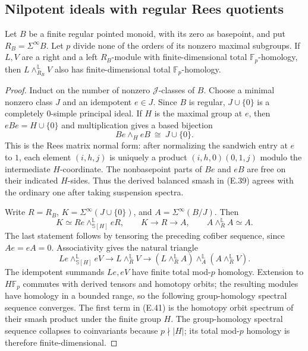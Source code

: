 \subsection{Nilpotent ideals with regular Rees quotients}

\begin{lemma}\label{E:regular-balanced-finiteness}
Let $B$ be a finite regular pointed monoid, with its zero as
basepoint, and put $R_B=\Sigma^\infty B$.  Let $p$ divide none of
the orders of its nonzero maximal subgroups.  If $L,V$ are a right
and a left $R_B$-module with finite-dimensional total
$\mathbb F_p$-homology, then
$L\wedge_{R_B}^{\mathbb L}V$ also has finite-dimensional total
$\mathbb F_p$-homology.
\end{lemma}

\begin{proof}
Induct on the number of nonzero $\mathcal J$-classes of $B$.
Choose a minimal nonzero class $J$ and an idempotent $e\in J$.
Since $B$ is regular, $J\cup\{0\}$ is a completely $0$-simple
principal ideal.  If $H$ is the maximal group at $e$, then
$eBe=H\cup\{0\}$ and multiplication gives a based bijection
\[
 Be\wedge_H eB\ \cong\ J\cup\{0\}.                 \tag{E.39}
\]
This is the Rees matrix normal form: after normalizing the sandwich
entry at $e$ to $1$, each element $(i,h,j)$ is uniquely a product
$(i,h,0)(0,1,j)$ modulo the intermediate $H$-coordinate.
The nonbasepoint parts of $Be$ and $eB$ are free on their indicated
$H$-sides.  Thus the derived balanced smash in (E.39) agrees with
the ordinary one after taking suspension spectra.

Write $R=R_B$, $K=\Sigma^\infty(J\cup\{0\})$, and
$A=\Sigma^\infty(B/J)$.  Then
\[
 K\simeq Re\wedge_{\mathbb S[H]}^{\mathbb L}eR,
 \qquad K\longrightarrow R\longrightarrow A,
 \qquad A\wedge_R^{\mathbb L}A\simeq A.               \tag{E.40}
\]
The last statement follows by tensoring the preceding cofiber
sequence, since $Ae=eA=0$.  Associativity gives the natural triangle
\[
 Le\wedge_{\mathbb S[H]}^{\mathbb L}eV
 \longrightarrow L\wedge_R^{\mathbb L}V
 \longrightarrow
 (L\wedge_R^{\mathbb L}A)
       \wedge_A^{\mathbb L}(A\wedge_R^{\mathbb L}V).   \tag{E.41}
\]
The idempotent summands $Le,eV$ have finite total mod-$p$ homology.
Extension to $H\mathbb F_p$ commutes with derived tensors and
homotopy orbits; the resulting modules have homology in a bounded
range, so the following group-homology spectral sequence converges.
The first term in (E.41) is the homotopy orbit spectrum of their
smash product under the finite group $H$.  The group-homology
spectral sequence collapses to coinvariants because $p\nmid|H|$;
its total mod-$p$ homology is therefore finite-dimensional.


\end{proof}
